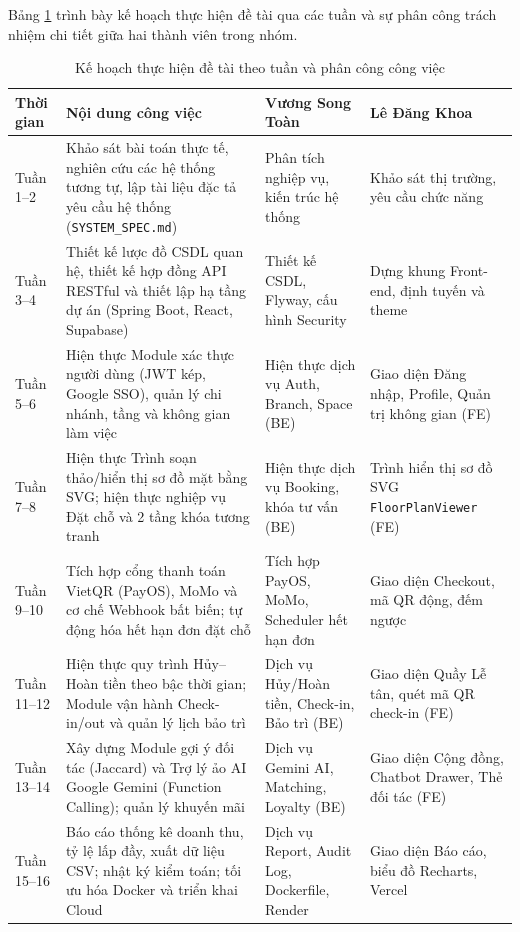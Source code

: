 Bảng \ref{tab:kehoach} trình bày kế hoạch thực hiện đề tài qua các tuần và sự phân công trách nhiệm chi tiết giữa hai thành viên trong nhóm.

\begin{table}[H]
\centering
\caption{Kế hoạch thực hiện đề tài theo tuần và phân công công việc}
\label{tab:kehoach}
\small
\renewcommand{\arraystretch}{1.25}
\begin{tabular}{|p{1.6cm}|p{7.2cm}|p{2.6cm}|p{2.6cm}|}
\hline
\textbf{Thời gian} & \textbf{Nội dung công việc} & \textbf{Vương Song Toàn} & \textbf{Lê Đăng Khoa} \\
\hline
Tuần 1--2 & Khảo sát bài toán thực tế, nghiên cứu các hệ thống tương tự, lập tài liệu đặc tả yêu cầu hệ thống (\texttt{SYSTEM\_SPEC.md}) & Phân tích nghiệp vụ, kiến trúc hệ thống & Khảo sát thị trường, yêu cầu chức năng \\
\hline
Tuần 3--4 & Thiết kế lược đồ CSDL quan hệ, thiết kế hợp đồng API RESTful và thiết lập hạ tầng dự án (Spring Boot, React, Supabase) & Thiết kế CSDL, Flyway, cấu hình Security & Dựng khung Front-end, định tuyến và theme \\
\hline
Tuần 5--6 & Hiện thực Module xác thực người dùng (JWT kép, Google SSO), quản lý chi nhánh, tầng và không gian làm việc & Hiện thực dịch vụ Auth, Branch, Space (BE) & Giao diện Đăng nhập, Profile, Quản trị không gian (FE) \\
\hline
Tuần 7--8 & Hiện thực Trình soạn thảo/hiển thị sơ đồ mặt bằng SVG; hiện thực nghiệp vụ Đặt chỗ và 2 tầng khóa tương tranh & Hiện thực dịch vụ Booking, khóa tư vấn (BE) & Trình hiển thị sơ đồ SVG \texttt{FloorPlanViewer} (FE) \\
\hline
Tuần 9--10 & Tích hợp cổng thanh toán VietQR (PayOS), MoMo và cơ chế Webhook bất biến; tự động hóa hết hạn đơn đặt chỗ & Tích hợp PayOS, MoMo, Scheduler hết hạn đơn & Giao diện Checkout, mã QR động, đếm ngược \\
\hline
Tuần 11--12 & Hiện thực quy trình Hủy--Hoàn tiền theo bậc thời gian; Module vận hành Check-in/out và quản lý lịch bảo trì & Dịch vụ Hủy/Hoàn tiền, Check-in, Bảo trì (BE) & Giao diện Quầy Lễ tân, quét mã QR check-in (FE) \\
\hline
Tuần 13--14 & Xây dựng Module gợi ý đối tác (Jaccard) và Trợ lý ảo AI Google Gemini (Function Calling); quản lý khuyến mãi & Dịch vụ Gemini AI, Matching, Loyalty (BE) & Giao diện Cộng đồng, Chatbot Drawer, Thẻ đối tác (FE) \\
\hline
Tuần 15--16 & Báo cáo thống kê doanh thu, tỷ lệ lấp đầy, xuất dữ liệu CSV; nhật ký kiểm toán; tối ưu hóa Docker và triển khai Cloud & Dịch vụ Report, Audit Log, Dockerfile, Render & Giao diện Báo cáo, biểu đồ Recharts, Vercel \\

\end{tabular}
\end{table}
